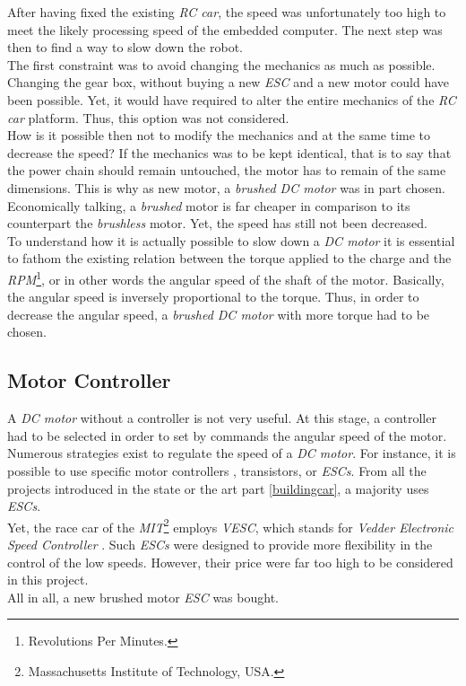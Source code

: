 		After having fixed the existing \textit{RC car}, the speed was unfortunately 
		too high to meet the likely processing speed of the embedded computer.
		The next step
		was then to find a way to slow down the robot. 
		\\\indent The first constraint was to avoid changing the mechanics as much as
		possible. Changing the gear box, without buying a new \textit{ESC} and a new
		motor could have been possible. Yet, it would have required to alter 
		the entire mechanics of the \textit{RC car} platform. Thus, this option was 
		not considered.
		\\\indent How is it possible then not to modify the mechanics and
		at the same time to decrease the speed? If the mechanics was to 
		be kept identical, that is to say that the power chain should 
		remain untouched, the motor has to remain of the same dimensions.
		This is why as new motor, a \textit{brushed DC motor} was in part 
		chosen. Economically talking, a \textit{brushed} motor is far cheaper
		in comparison to its counterpart the \textit{brushless} motor. Yet, the
		speed has still not been decreased.
		\\\indent To understand how it is actually possible to 
		slow down a \textit{DC motor} it is essential to fathom the 
		existing relation between the torque applied to the charge
		and the \textit{RPM}\footnote{Revolutions Per Minutes.},
		or in other words the angular speed 
		of the shaft of the motor. Basically, the angular speed is
		inversely proportional 
		to the torque. Thus, in order to decrease the angular speed, a 
		\textit{brushed DC motor} with more torque had to be chosen. \cite{bonanza, motor}
		
		\subsection{Motor Controller}
		
		A \textit{DC motor} without a controller is not very useful. At this 
		stage, a controller had to be selected in order to set by commands
		the angular speed of the motor.
		Numerous strategies exist to regulate the speed of a \textit{DC motor}.
		For instance, it is possible to use specific motor controllers \cite{f1tenth}, 
		transistors, or \textit{ESCs}. From all the projects introduced
		in the state or the art part \vref{buildingcar}, a majority 
		uses \textit{ESCs}.
		\\\indent Yet, the race car of the \textit{MIT}\footnote{Massachusetts Institute
		of Technology, USA.} employs \textit{VESC}, which stands for \textit{Vedder 
		Electronic Speed Controller} \cite{mitracecar}. Such \textit{ESCs} were designed
		to provide more flexibility in the control of the low speeds. However, their price
		were far too high to be considered in this project.
		\\\indent All in all, a new brushed motor \textit{ESC} was bought.
	
